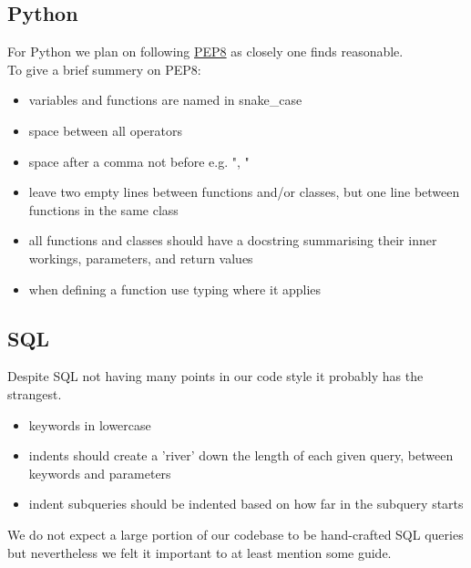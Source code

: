 \subsection{Python}
For Python we plan on following \href{https://peps.python.org/pep-0008/}{PEP8} as closely one finds reasonable.\\

To give a brief summery on PEP8:
\begin{itemize}
    \item variables and functions are named in snake\_case
    \item space between all operators
    \item space after a comma not before e.g. ", "
    \item leave two empty lines between functions and/or classes, but one line between functions in the same class
    \item all functions and classes should have a docstring summarising their inner workings, parameters, and return values
    \item when defining a function use typing where it applies
\end{itemize}

\subsection{SQL}
Despite SQL not having many points in our code style it probably has the strangest.

\begin{itemize}
    \item keywords in lowercase
    \item indents should create a 'river' down the length of each given query, between keywords and parameters
    \item indent subqueries should be indented based on how far in the subquery starts
\end{itemize}

We do not expect a large portion of our codebase to be hand-crafted SQL queries but nevertheless we felt it important to at least mention some guide.